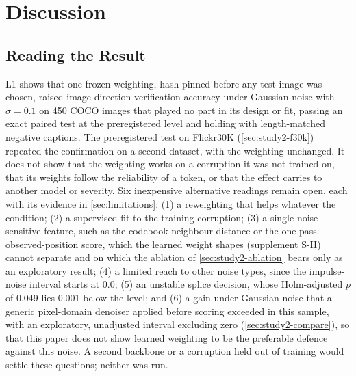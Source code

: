 
\section{Discussion}\label{sec:discussion}

\subsection{Reading the Result}\label{sec:disc-study2}
L1 shows that one frozen weighting, hash-pinned before any test image was chosen, raised image-direction verification accuracy under
Gaussian noise with $\sigma=0.1$ on 450 COCO images that played no part in its design or fit, passing an exact paired test at the
preregistered level and holding with length-matched negative captions.
The preregistered test on Flickr30K (\cref{sec:study2-f30k}) repeated the confirmation on a second dataset, with the weighting unchanged.
It does not show that the weighting works on a corruption it was not trained on, that its weights follow the reliability of a token,
or that the effect carries to another model or severity.
Six inexpensive alternative readings remain open, each with its evidence in \cref{sec:limitations}: (1) a reweighting that helps
whatever the condition; (2) a supervised fit to the training corruption; (3) a single noise-sensitive feature, such as the
codebook-neighbour distance or the one-pass observed-position score, which the learned weight shapes (supplement S-II) cannot separate and on which the
ablation of \cref{sec:study2-ablation} bears only as an exploratory result; (4) a limited reach to other noise types, since the
impulse-noise interval starts at 0.0; (5) an unstable splice decision, whose Holm-adjusted $p$ of 0.049 lies 0.001 below the level; and
(6) a gain under Gaussian noise that a generic pixel-domain denoiser applied before scoring exceeded in this sample, with an exploratory, unadjusted interval excluding zero (\cref{sec:study2-compare}), so that this paper does not show learned weighting to be the preferable defence against this noise.
A second backbone or a corruption held out of training would settle these questions; neither was run.

